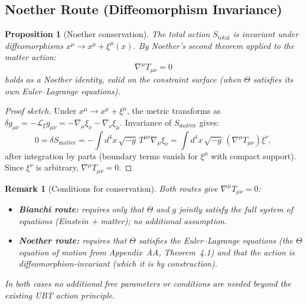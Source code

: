 \documentclass[12pt]{article}
\newtheorem{proposition}[definition]{Proposition}
\newtheorem{remark}[definition]{Remark}
\begin{document}
\subsection{Noether Route (Diffeomorphism Invariance)}

\begin{proposition}[Noether conservation]
\label{prop:noether}
The total action $S_{\mathrm{total}}$ is invariant under diffeomorphisms
$x^\mu \to x^\mu + \xi^\mu(x)$.  By Noether's second theorem applied to
the matter action:
\begin{equation}
  \nabla^\mu T_{\mu\nu} = 0
\end{equation}
holds as a \emph{Noether identity}, valid on the constraint surface
(when $\Theta$ satisfies its own Euler--Lagrange equations).
\end{proposition}

\begin{proof}[Proof sketch]
  Under $x^\mu \to x^\mu + \xi^\mu$, the metric transforms as
  $\delta g_{\mu\nu} = -\mathcal{L}_\xi g_{\mu\nu}
  = -\nabla_\mu\xi_\nu - \nabla_\nu\xi_\mu$.
  Invariance of $S_{\mathrm{matter}}$ gives:
  \begin{equation}
    0 = \delta S_{\mathrm{matter}}
      = -\int d^4x\,\sqrt{-g}\,T^{\mu\nu}\nabla_\mu\xi_\nu
      = \int d^4x\,\sqrt{-g}\,(\nabla^\mu T_{\mu\nu})\xi^\nu,
  \end{equation}
  after integration by parts (boundary terms vanish for $\xi^\mu$ with
  compact support).  Since $\xi^\nu$ is arbitrary,
  $\nabla^\mu T_{\mu\nu} = 0$.
\end{proof}

\begin{remark}[Conditions for conservation]
  Both routes give $\nabla^\mu T_{\mu\nu} = 0$:
  \begin{itemize}
    \item \textbf{Bianchi route:} requires only that $\Theta$ and $g$ jointly
          satisfy the full system of equations (Einstein + matter);
          no additional assumption.
    \item \textbf{Noether route:} requires that $\Theta$ satisfies the
          Euler--Lagrange equations (the $\Theta$ equation of motion from
          Appendix~AA, Theorem~4.1) \emph{and} that the action is
          diffeomorphism-invariant (which it is by construction).
  \end{itemize}
  In both cases no additional free parameters or conditions are needed
  beyond the existing UBT action principle.
\end{remark}
\end{document}
